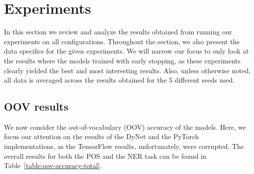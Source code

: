 
\section{Experiments}\label{sec:experiments}

In this section we review and analyze the results obtained from running our
experiments on all configurations. Throughout the section, we also present the
data specifics for the given experiments. We will narrow our focus to only look
at the results where the models trained with early stopping, as these
experiments clearly yielded the best and most interesting results. Also, unless
otherwise noted, all data is averaged across the results obtained for the 5
different seeds used.




\subsection{OOV results}

We now consider the out-of-vocabulary (OOV) accuracy of the models. Here, we
focus our attention on the results of the DyNet and the PyTorch implementations,
as the TensorFlow results, unfortunately, were corrupted. The overall results
for both the POS and the NER task can be found in
Table~\ref{table:oov-accuracy-total}.

